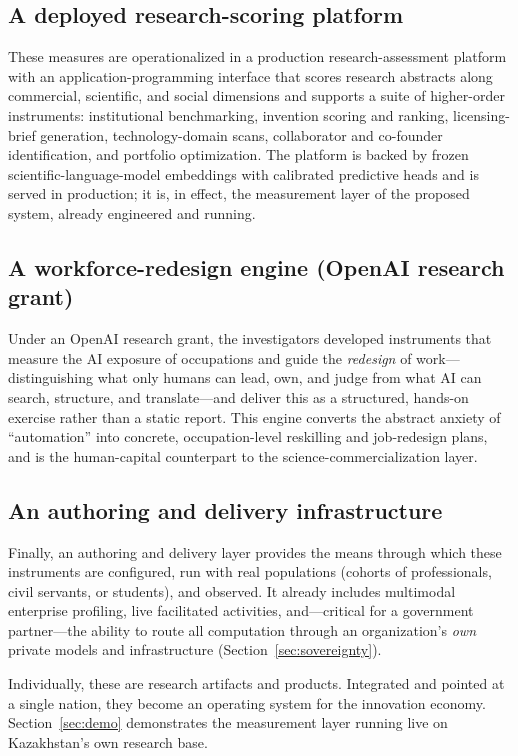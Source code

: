 \documentclass[11pt]{article}
\begin{document}
\subsection{A deployed research-scoring platform}
These measures are operationalized in a production research-assessment platform
with an application-programming interface that scores research abstracts along commercial,
scientific, and social dimensions and supports a suite of higher-order
instruments: institutional benchmarking, invention scoring and ranking,
licensing-brief generation, technology-domain scans, collaborator and
co-founder identification, and portfolio optimization. The platform is backed by
frozen scientific-language-model embeddings with calibrated predictive heads and
is served in production; it is, in effect, the measurement layer of the proposed
system, already engineered and running.

\subsection{A workforce-redesign engine (OpenAI research grant)}
Under an OpenAI research grant, the investigators developed instruments that
measure the AI exposure of occupations and guide the \emph{redesign} of work---
distinguishing what only humans can lead, own, and judge from what AI can search,
structure, and translate---and deliver this as a structured, hands-on exercise
rather than a static report. This engine converts the abstract anxiety of
``automation'' into concrete, occupation-level reskilling and job-redesign plans,
and is the human-capital counterpart to the science-commercialization layer.

\subsection{An authoring and delivery infrastructure}
Finally, an authoring and delivery layer provides the means through which
these instruments are configured, run with real
populations (cohorts of professionals, civil servants, or students), and
observed. It already includes multimodal enterprise profiling, live facilitated
activities, and---critical for a government partner---the ability to route all
computation through an organization's \emph{own} private models and
infrastructure (Section~\ref{sec:sovereignty}).

Individually, these are research artifacts and products. Integrated and pointed
at a single nation, they become an operating system for the innovation economy.
Section~\ref{sec:demo} demonstrates the measurement layer running live on
Kazakhstan's own research base.
\end{document}
